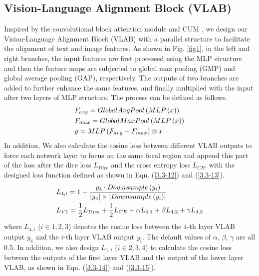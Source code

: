 \documentclass{article}
\begin{document}
\vspace{-5mm}
\subsection{Vision-Language Alignment Block (VLAB)}
\vspace{-2mm}
Inspired by the convolutional block attention module \cite{li2022tfcns} and CUM \cite{li2022semi}, we design our Vision-Language Alignment Block (VLAB) with a parallel structure to facilitate the alignment of text and image features. As shown in Fig. \ref{fig1}, in the left and right branches, the input features are first processed using the MLP structure and then the feature maps are subjected to global max pooling (GMP) and global average pooling (GAP), respectively. The outputs of two branches are added to further enhance the same features, and finally multiplied with the input after two layers of MLP structure. The process can be defined as follows.
\vspace{-2mm}
\begin{eqnarray}
\setlength{\abovedisplayskip}{0pt}
\setlength{\belowdisplayskip}{0pt}
& F_{avg}=GlobalAvgPool\left ( MLP\left (   x\right  )\right )\\
& F_{max}=GlobalMaxPool\left ( MLP\left (   x\right  )\right )\\
& y= MLP\left (F_{avg}+F_{max}\right )\otimes  x
\end{eqnarray}
In addition, We also calculate the cosine loss between different VLAB outputs to force each network layer to focus on the same focal region and append this part of the loss after the dice loss $L_{Dice}$ and the cross entropy loss $L_{CE}$, with the designed loss function defined as shown in Eqn. (\ref{3.3-12}) and (\ref{3.3-13}).
\vspace{-2mm}
\begin{eqnarray}
\setlength{\abovedisplayskip}{0pt}
\setlength{\belowdisplayskip}{0pt}
& L_{4,i}=1-\frac{y_{4}\cdot Downsample\left ( y_{i}\right ) }{\left | y_{4}\right |\times\left | Downsample\left ( y_{i}\right )\right | }\label{3.3-12}\\
& L_{V1}=\frac{1}{2}L_{Dice}+\frac{1}{2}L_{CE}+\alpha L_{4,1}+\beta L_{4,2}+\gamma L_{4,3}\label{3.3-13}
\end{eqnarray}
where $L_{4,i}$ ($i\in 1,2,3$) denotes the cosine loss between the 4-th layer VLAB output $y_{4}$ and the $i$-th layer VLAB output $y_{i}$. The default values of $\alpha$, $\beta$, $\gamma$ are all 0.5. In addition, we also design $L_{1,i}$ ($i\in 2,3,4$) to calculate the cosine loss between the outputs of the first layer VLAB and the output of the lower layer VLAB, as shown in Eqn. (\ref{3.3-14}) and (\ref{3.3-15}).
\end{document}
